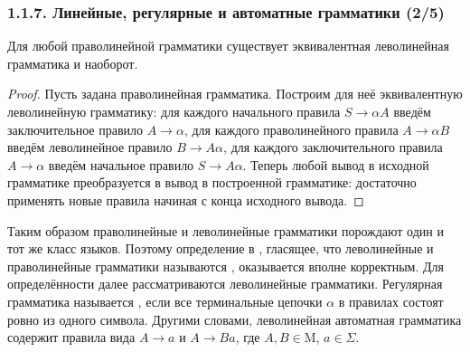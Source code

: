 \begin{frame}
\frametitle{1.1.7. Линейные, регулярные и автоматные грамматики (2/5)}
\begin{theorem}
Для любой праволинейной грамматики 
существует эквивалентная леволинейная грамматика
и наоборот.
\end{theorem}
\begin{proof}
Пусть задана праволинейная грамматика. 
Построим для неё эквивалентную 
леволинейную грамматику: 
для каждого начального правила 
$S\rightarrow \alpha A$ введём
заключительное правило 
$A\rightarrow \alpha$,
для каждого праволинейного правила 
$A\rightarrow \alpha B$ введём
леволинейное правило 
$B\rightarrow A\alpha$,
для каждого заключительного правила 
$A\rightarrow \alpha$ введём
начальное правило 
$S\rightarrow A\alpha $.
Теперь любой вывод 
в исходной грамматике 
преобразуется в вывод в построенной грамматике:
достаточно применять новые правила начиная с конца исходного вывода.
\end{proof}

Таким образом праволинейные и леволинейные грамматики порождают один и тот же класс языков.
Поэтому определение в , 
гласящее, что леволинейные и
праволинейные грамматики называются
,
оказывается вполне корректным. 
Для определённости далее рассматриваются леволинейные грамматики. 
Регулярная грамматика
называется , если все
терминальные цепочки $\alpha$ в правилах состоят ровно из одного
символа. Другими словами, леволинейная автоматная грамматика
содержит правила вида $A\rightarrow a$ и $A\rightarrow B a$, где
$A, B \in \mathrm{M}$, $a\in \Sigma$.

\end{frame}



